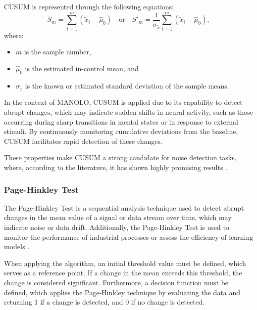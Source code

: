 CUSUM is represented through the following equations:
\begin{equation}
S_m = \sum_{i=1}^{m} (\tilde{x}_i - \hat{\mu}_0) \quad \text{or} \quad S'_m = \frac{1}{\sigma_{\tilde{x}}} \sum_{i=1}^{m} (\tilde{x}_i - \hat{\mu}_0),
\end{equation}
where:
\begin{itemize}
    \item $m$ is the sample number,
    \vspace{-0.4cm}
    \item $\hat{\mu}_0$ is the estimated in-control mean, and
    \vspace{-0.4cm}
    \item $\sigma_{\tilde{x}}$ is the known or estimated standard deviation of the sample means.
\end{itemize}

In the context of MANOLO, CUSUM is applied due to its capability to detect abrupt changes, which may indicate sudden shifts in neural activity, such as those occurring during sharp transitions in mental states or in response to external stimuli. By continuously monitoring cumulative deviations from the baseline, CUSUM facilitates rapid detection of these changes.

These properties make CUSUM a strong candidate for noise detection tasks, where, according to the literature, it has shown highly promising results \cite{artyushenko2021modeling}\cite{volovach2021detection}\cite{tam2009theoretical}\cite{yi2021adaptive}.

\subsubsection{Page-Hinkley Test}
The Page-Hinkley Test is a sequential analysis technique used to detect abrupt changes \cite{sebastiao2017supporting} in the mean value of a signal or data stream over time, which may indicate noise or data drift. Additionally, the Page-Hinkley Test is used to monitor the performance of industrial processes \cite{mouss2004test} or assess the efficiency of learning models \cite{ali2023understanding}.

When applying the algorithm, an initial threshold value must be defined, which serves as a reference point. If a change in the mean exceeds this threshold, the change is considered significant. Furthermore, a decision function must be defined, which applies the Page-Hinkley technique by evaluating the data and returning 1 if a change is detected, and 0 if no change is detected.

